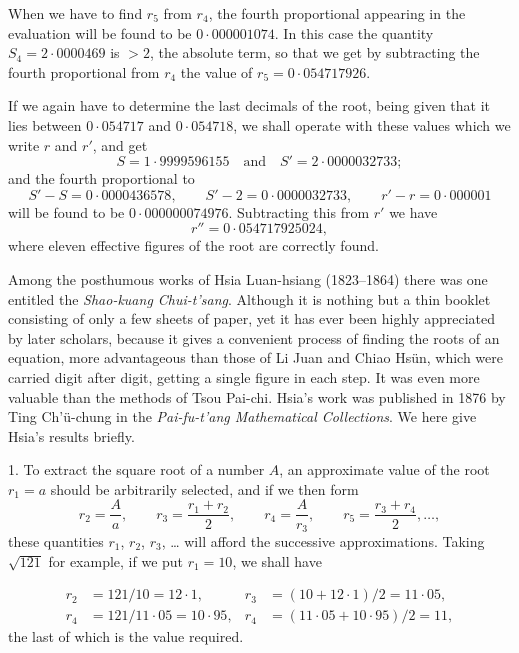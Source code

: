 \documentclass[11pt]{article}
\newcommand{\scanpage}[2]{\clearpage\setcounter{footnote}{0}\noindent{\footnotesize\color{gray}PDF page #1 · #2}\par\medskip}
\newcommand{\scanfooter}{}
\begin{document}
When we have to find $r_5$ from $r_4$, the fourth proportional appearing in the evaluation will be found to be $0\cdot 000001074$. In this case the quantity $S_4=2\cdot 0000469$ is $>2$, the absolute term, so that we get by subtracting the fourth proportional from $r_4$ the value of $r_5=0\cdot 054717926$.

If we again have to determine the last decimals of the root, being given that it lies between $0\cdot 054717$ and $0\cdot 054718$, we shall operate with these values which we write $r$ and $r'$, and get
\[
S=1\cdot 9999596155\quad\text{and}\quad S'=2\cdot 0000032733;
\]
and the fourth proportional to
\[
S'-S=0\cdot 0000436578,\qquad S'-2=0\cdot 0000032733,\qquad r'-r=0\cdot 000001
\]
will be found to be $0\cdot 000000074976$. Subtracting this from $r'$ we have
\[
r''=0\cdot 054717925024,
\]
where eleven effective figures of the root are correctly found.

Among the posthumous works of Hsia Luan-hsiang (1823--1864) there was one entitled the \emph{Shao-kuang Chui-t'sang}. Although it is nothing but a thin booklet consisting of only a few sheets of paper, yet it has ever been highly appreciated by later scholars, because it gives a convenient process of finding the roots of an equation, more advantageous than those of Li Juan and Chiao Hsün, which were carried digit after digit, getting a single figure in each step. It was even more valuable than the methods of Tsou Pai-chi. Hsia's work was published in 1876 by Ting Ch'ü-chung in the \emph{Pai-fu-t'ang Mathematical Collections}. We here give Hsia's results briefly.

1. To extract the square root of a number $A$, an approximate value of the root $r_1=a$ should be arbitrarily selected, and if we then form
\[
r_2=\frac{A}{a},\qquad
r_3=\frac{r_1+r_2}{2},\qquad
r_4=\frac{A}{r_3},\qquad
r_5=\frac{r_3+r_4}{2},\ldots,
\]
these quantities $r_1$, $r_2$, $r_3$, \ldots{} will afford the successive approximations. Taking $\sqrt{121}$ for example, if we put $r_1=10$, we shall have
\scanfooter

\scanpage{0147}{Chapter 19, printed page 133}
\[
\begin{aligned}
r_2&=121/10=12\cdot 1, & r_3&=(10+12\cdot 1)/2=11\cdot 05,\\
r_4&=121/11\cdot 05=10\cdot 95, & r_4&=(11\cdot 05+10\cdot 95)/2=11,
\end{aligned}
\]
the last of which is the value required.
\end{document}

